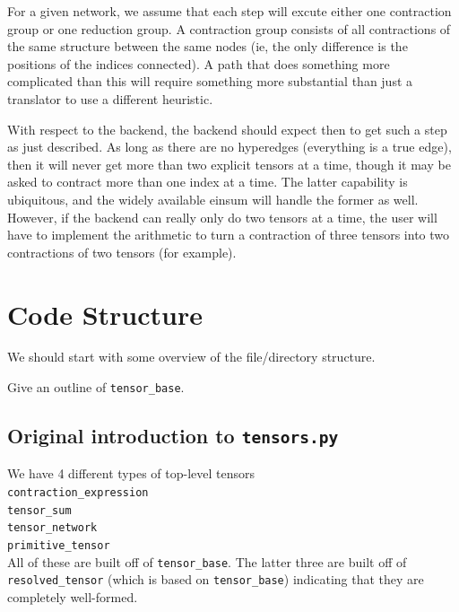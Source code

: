 \documentclass[12pt,letterpaper]{article}
\begin{document}
For a given network, we assume
that each step will excute either one contraction group or one reduction group.
A contraction group consists of all contractions of the same structure between the same
 nodes (ie, the only difference is the positions of the indices connected).
A path that does something more complicated than this will require something more 
 substantial than just a translator to use a different heuristic.

With respect to the backend, the backend should expect then to get such a step as just described.
As long as there are no hyperedges (everything is a true edge), then it will never get more than
two explicit tensors at a time, though it may be asked to contract more than one index at a time.
The latter capability is ubiquitous, and the widely available einsum will handle the former as well.
However, if the backend can really only do two tensors at a time, the user will have to implement
the arithmetic to turn a contraction of three tensors into two contractions of two tensors
(for example).


		\section{Code Structure}

We should start with some overview of the file/directory structure.

Give an outline of 
\texttt{tensor\_base}.



	\subsection{Original introduction to \texttt{tensors.py}}

We have 4 different types of top-level tensors \\
  \texttt{contraction\_expression} \\
  \texttt{tensor\_sum} \\
  \texttt{tensor\_network} \\
  \texttt{primitive\_tensor} \\
All of these are built off of \texttt{tensor\_base}.  The latter three are built off of \texttt{resolved\_tensor} (which
is based on \texttt{tensor\_base}) indicating that they are completely well-formed.
\end{document}
